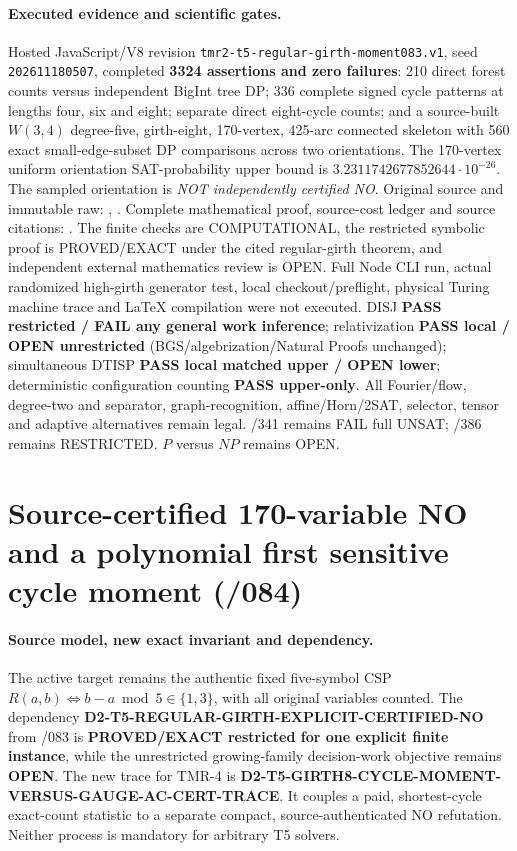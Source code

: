 \documentclass[11pt]{article}
\begin{document}
\paragraph{Executed evidence and scientific gates.}
Hosted JavaScript/V8 revision
\texttt{tmr2-t5-regular-girth-moment083.v1}, seed
\texttt{202611180507}, completed \textbf{3324 assertions and zero
failures}: 210 direct forest counts versus independent BigInt tree
DP; 336 complete signed cycle patterns at lengths four, six and
eight; separate direct eight-cycle counts; and a source-built
$W(3,4)$ degree-five, girth-eight, 170-vertex, 425-arc connected
skeleton with 560 exact small-edge-subset DP comparisons across
two orientations. The 170-vertex uniform orientation SAT-probability
upper bound is $3.2311742677852644\cdot10^{-26}$.
The sampled orientation is \emph{NOT independently certified NO}.
Original source and immutable raw:
,
.
Complete mathematical proof, source-cost ledger and source citations:
.
The finite checks are COMPUTATIONAL, the restricted symbolic
proof is PROVED/EXACT under the cited regular-girth theorem,
and independent external mathematics review is OPEN.
Full Node CLI run, actual randomized high-girth generator test,
local checkout/preflight, physical Turing machine trace and
LaTeX compilation were not executed.
DISJ \textbf{PASS restricted / FAIL any general work inference};
relativization \textbf{PASS local / OPEN unrestricted}
(BGS/algebrization/Natural Proofs unchanged);
simultaneous DTISP \textbf{PASS local matched upper / OPEN lower};
deterministic configuration counting \textbf{PASS upper-only}.
All Fourier/flow, degree-two and separator, graph-recognition,
affine/Horn/2SAT, selector, tensor and adaptive alternatives remain
legal. /341 remains FAIL full UNSAT; /386 remains RESTRICTED.
$P$ versus $NP$ remains OPEN.

\section{Source-certified 170-variable NO and a polynomial first sensitive cycle moment (/084)}
\paragraph{Source model, new exact invariant and dependency.}
The active target remains the authentic fixed five-symbol CSP
$R(a,b)\iff b-a\bmod5\in\{1,3\}$, with all original variables
counted. The dependency \textbf{D2-T5-REGULAR-GIRTH-EXPLICIT-CERTIFIED-NO}
from /083 is \textbf{PROVED/EXACT restricted for one explicit
finite instance}, while the unrestricted growing-family
decision-work objective remains \textbf{OPEN}. The new trace for TMR-4
is \textbf{D2-T5-GIRTH8-CYCLE-MOMENT-VERSUS-GAUGE-AC-CERT-TRACE}.
It couples a paid, shortest-cycle exact-count statistic to
a separate compact, source-authenticated NO refutation.
Neither process is mandatory for arbitrary T5 solvers.
\end{document}

